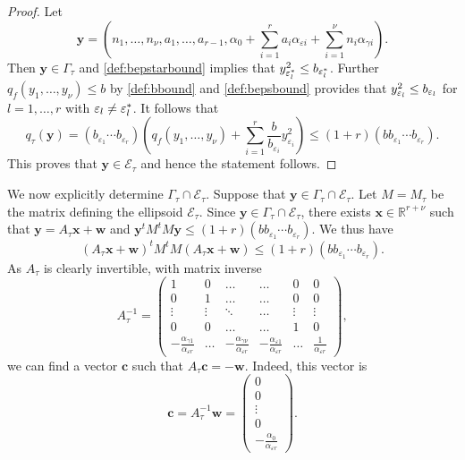\begin{proof}
Let 
\[\mathbf{y} = \left(n_1, \dots, n_{\nu}, a_1, \dots, a_{r-1}, \alpha_0+\sum_{i = 1}^r a_i \alpha_{\varepsilon i} + \sum_{i = 1}^{\nu} n_i \alpha_{\gamma i}\right).\]
Then $\mathbf{y} \in \Gamma_\tau$ and \eqref{def:bepstarbound} implies that $y_{\varepsilon_l^*}^2\leq b_{\varepsilon_l^*}$. Further $q_f(y_1, \dots, y_{\nu})\leq b$ by \eqref{def:bbound} and \eqref{def:bepsbound} provides that $y_{\varepsilon_l}^2\leq b_{\varepsilon_l}$ for $l = 1, \dots, r$ with $\varepsilon_l \neq \varepsilon_l^*$. It follows that 
\[q_\tau(\mathbf{y}) = (b_{\varepsilon_1}\cdots b_{\varepsilon_r})\left( q_f(y_1, \dots, y_{\nu}) + \sum_{i = 1}^r\frac{b}{b_{\varepsilon_i}}y_{\varepsilon_i}^2\right) \leq (1+r)(bb_{\varepsilon_1}\cdots b_{\varepsilon_r}).\]
This proves that $\mathbf{y}\in\mathcal E_\tau$ and hence the statement follows.
\end{proof}
%
We now explicitly determine $ \Gamma_\tau\cap \mathcal E_\tau$. Suppose that $\mathbf{y}\in \Gamma_\tau\cap \mathcal E_\tau$. Let $M=M_\tau$ be the matrix defining the ellipsoid $\mathcal{E}_{\tau}$. 	
Since $\mathbf{y}\in \Gamma_\tau\cap \mathcal E_\tau$, there exists $\mathbf{x}\in \mathbb{R}^{r + \nu}$ such that $\mathbf{y}= A_\tau \mathbf{x}+\mathbf{w}$ and ${\mathbf{y}^tM^tM\mathbf{y}\leq (1 + r)(bb_{\varepsilon_1}\cdots b_{\varepsilon_r})}$. We thus have
\[(A_\tau \mathbf{x}+\mathbf{w})^tM^tM(A_\tau \mathbf{x}+\mathbf{w}) \leq (1 + r)(bb_{\varepsilon_1}\cdots b_{\varepsilon_r}).\]
As $A_{\tau}$ is clearly invertible, with matrix inverse
\[A_{\tau}^{-1} = \begin{pmatrix}
	1 & 0 & \dots &  \dots & 0 & 0\\ 
	0 & 1	& \dots & \dots & 0 & 0\\
	\vdots & \vdots & \ddots & \dots & \vdots & \vdots \\ 
	0 & 0 & \dots &  \dots & 1 & 0\\ 
	-\frac{\alpha_{\gamma 1}}{\alpha_{\varepsilon {r}}} & \dots &-\frac{\alpha_{\gamma {\nu}}}{\alpha_{\varepsilon {r}}} & -\frac{\alpha_{\varepsilon 1}}{\alpha_{\varepsilon {r}}} & \dots & \frac{1}{\alpha_{\varepsilon {r}}}
\end{pmatrix},\]
we can find a vector $\mathbf{c}$ such that $A_{\tau}\mathbf{c} = -\mathbf{w}$. Indeed, this vector is
\[\mathbf{c} = A_{\tau}^{-1}\mathbf{w} =\begin{pmatrix}
	0 \\ 0 \\ \vdots \\ 0 \\ -\frac{\alpha_0}{\alpha_{\varepsilon r}}
\end{pmatrix}.\]
